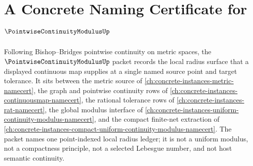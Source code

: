 \chapter{A Concrete Naming Certificate for $\PointwiseContinuityModulusUp$}
\label{ch:concrete-instances-pointwise-continuity-modulus-namecert}

Following Bishop--Bridges pointwise continuity on metric spaces, the $\PointwiseContinuityModulusUp$ packet records the local radius surface that a displayed continuous map supplies at a single named source point and target tolerance. It sits between the metric source of \autoref{ch:concrete-instances-metric-namecert}, the graph and pointwise continuity rows of \autoref{ch:concrete-instances-continuousmap-namecert}, the rational tolerance rows of \autoref{ch:concrete-instances-rat-namecert}, the global modulus interface of \autoref{ch:concrete-instances-uniform-continuity-modulus-namecert}, and the compact finite-net extraction of \autoref{ch:concrete-instances-compact-uniform-continuity-modulus-namecert}. The packet names one point-indexed local radius ledger; it is not a uniform modulus, not a compactness principle, not a selected Lebesgue number, and not host semantic continuity.

